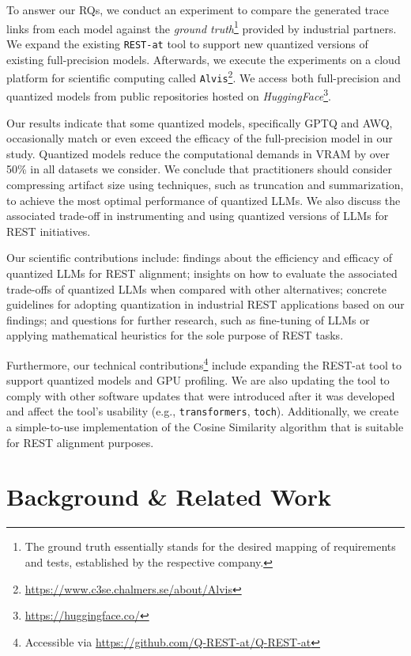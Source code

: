 \documentclass[conference]{IEEEtran}
\begin{document}
To answer our RQs, we conduct an experiment to compare the generated trace links from each model against the \textit{ground truth}\footnote{The ground truth essentially stands for the desired mapping of requirements and tests, established by the respective company.} provided by industrial partners. We expand the existing \verb|REST-at| tool to support new quantized versions of existing full-precision models. Afterwards, we execute the experiments on a cloud platform for scientific computing called \verb|Alvis|\footnote{\url{https://www.c3se.chalmers.se/about/Alvis}}. We access both full-precision and quantized models from public repositories hosted on \textit{HuggingFace}\footnote{\url{https://huggingface.co/}}.

Our results indicate that some quantized models, specifically GPTQ and AWQ, occasionally match or even exceed the efficacy of the full-precision model in our study. Quantized models reduce the computational demands in VRAM by over 50\% in all datasets we consider. We conclude that practitioners should consider compressing artifact size using techniques, such as truncation and summarization, to achieve the most optimal performance of quantized LLMs. We also discuss the associated trade-off in instrumenting and using quantized versions of LLMs for REST initiatives.

Our scientific contributions include: findings about the efficiency and efficacy of quantized LLMs for REST alignment; insights on how to evaluate the associated trade-offs of quantized LLMs when compared with other alternatives; concrete guidelines for adopting quantization in industrial REST applications based on our findings; and questions for further research, such as fine-tuning of LLMs or applying mathematical heuristics for the sole purpose of REST tasks.

Furthermore, our technical contributions\footnote{Accessible via \url{https://github.com/Q-REST-at/Q-REST-at}} include expanding the REST-at tool to support quantized models and GPU profiling. We are also updating the tool to comply with other software updates that were introduced after it was developed and affect the tool's usability (e.g., \verb|transformers|, \verb|toch|). Additionally, we create a simple-to-use implementation of the Cosine Similarity algorithm that is suitable for REST alignment purposes. 

\section{Background \& Related Work}\label{background}
\end{document}
